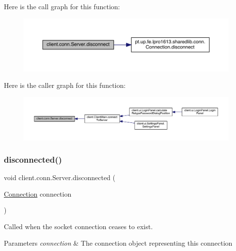Here is the call graph for this function\+:
\nopagebreak
\begin{figure}[H]
\begin{center}
\leavevmode
\includegraphics[width=350pt]{classclient_1_1conn_1_1_server_ab69a81693f41986321e92120aa0918cb_cgraph}
\end{center}
\end{figure}
Here is the caller graph for this function\+:
\nopagebreak
\begin{figure}[H]
\begin{center}
\leavevmode
\includegraphics[width=350pt]{classclient_1_1conn_1_1_server_ab69a81693f41986321e92120aa0918cb_icgraph}
\end{center}
\end{figure}
\hypertarget{classclient_1_1conn_1_1_server_ae2a0ab226b1622da8e19137fb89bdc81}{}\label{classclient_1_1conn_1_1_server_ae2a0ab226b1622da8e19137fb89bdc81} 
\subsubsection{\texorpdfstring{disconnected()}{disconnected()}}
{\footnotesize\ttfamily void client.\+conn.\+Server.\+disconnected (\begin{DoxyParamCaption}\item[{\hyperlink{classpt_1_1up_1_1fe_1_1lpro1613_1_1sharedlib_1_1conn_1_1_connection}{Connection}}]{connection }\end{DoxyParamCaption})}

Called when the socket connection ceases to exist.


\begin{DoxyParams}{Parameters}
{\em connection} & The connection object representing this connection \\
\hline
\end{DoxyParams}


